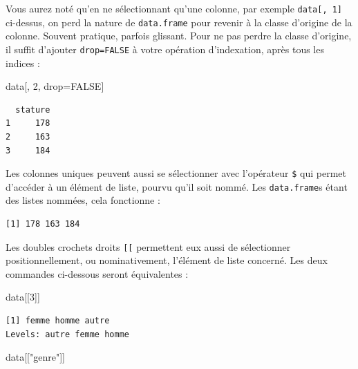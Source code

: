 \documentclass[
  letterpaper,
  DIV=11,
  numbers=noendperiod]{scrreprt}
\newenvironment{Shaded}{\begin{snugshade}}{\end{snugshade}}
\newcommand{\ConstantTok}[1]{\textcolor[rgb]{0.56,0.35,0.01}{#1}}
\newcommand{\DecValTok}[1]{\textcolor[rgb]{0.68,0.00,0.00}{#1}}
\newcommand{\NormalTok}[1]{\textcolor[rgb]{0.00,0.23,0.31}{#1}}
\newcommand{\OtherTok}[1]{\textcolor[rgb]{0.00,0.23,0.31}{#1}}
\newcommand{\SpecialCharTok}[1]{\textcolor[rgb]{0.37,0.37,0.37}{#1}}
\newcommand{\StringTok}[1]{\textcolor[rgb]{0.13,0.47,0.30}{#1}}
\begin{document}
Vous aurez noté qu'en ne sélectionnant qu'une colonne, par exemple
\texttt{data{[},\ 1{]}} ci-dessus, on perd la nature de
\texttt{data.frame} pour revenir à la classe d'origine de la colonne.
Souvent pratique, parfois glissant. Pour ne pas perdre la classe
d'origine, il suffit d'ajouter \texttt{drop=FALSE} à votre opération
d'indexation, après tous les indices :

\begin{Shaded}
\begin{Highlighting}[]
\NormalTok{data[, }\DecValTok{2}\NormalTok{, drop}\OtherTok{=}\ConstantTok{FALSE}\NormalTok{]}
\end{Highlighting}
\end{Shaded}

\begin{verbatim}
  stature
1     178
2     163
3     184
\end{verbatim}

Les colonnes uniques peuvent aussi se sélectionner avec l'opérateur
\texttt{\$} qui permet d'accéder à un élément de liste, pourvu qu'il
soit nommé. Les \texttt{data.frame}s étant des listes nommées, cela
fonctionne :

\begin{Shaded}
\end{Shaded}

\begin{verbatim}
[1] 178 163 184
\end{verbatim}

Les doubles crochets droits \texttt{{[}{[}} permettent eux aussi de
sélectionner positionnellement, ou nominativement, l'élément de liste
concerné. Les deux commandes ci-dessous seront équivalentes :

\begin{Shaded}
\begin{Highlighting}[]
\NormalTok{data[[}\DecValTok{3}\NormalTok{]]}
\end{Highlighting}
\end{Shaded}

\begin{verbatim}
[1] femme homme autre
Levels: autre femme homme
\end{verbatim}

\begin{Shaded}
\begin{Highlighting}[]
\NormalTok{data[[}\StringTok{"genre"}\NormalTok{]]}
\end{Highlighting}
\end{Shaded}
\end{document}
